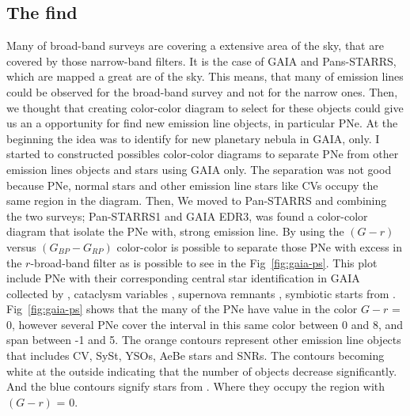 \documentclass[fleqn,usenatbib]{mnras}
\begin{document}
\subsection{The find}
\label{sec:find}

Many of broad-band surveys are covering a extensive area of the sky, that
are covered by those narrow-band filters. It is the case of GAIA and Pans-STARRS, which
are mapped a great are of the sky.
This means, that many of emission lines could be observed for the broad-band
survey and not for the narrow ones. Then, we thought that creating color-color
diagram to select for these objects
could give us an a opportunity for find new emission line objects, in particular PNe.
At the beginning the idea was to identify for new planetary nebula in GAIA, only.
I started to constructed possibles color-color diagrams to separate PNe from
other emission lines objects and stars using GAIA only. The separation was not
good because PNe, normal stars and other emission line stars like CVs occupy the
same region in the diagram. Then, We moved to Pan-STARRS and combining the two
surveys; Pan-STARRS1 and GAIA EDR3, was found a color-color diagram that isolate the PNe
with, strong \ha{} emission line. By using the \((G - r)\) versus \((G_{BP} - G_{RP})\)
color-color is possible to separate those PNe with excess in the $r$-broad-band
filter as is possible to see in the Fig~\ref{fig:gaia-ps}. This plot include PNe with their corresponding central star identification in GAIA collected by \citet{Gonzalez:2021}, 
cataclysm variables \citep{Downes:2006}, supernova remnants \citep{Green:2019}, symbiotic starts
from \citet{Akras:2019a}.  
Fig~\ref{fig:gaia-ps} shows that the many of the PNe have value in
the color \(G - r\) = 0, however several PNe cover the interval in this
same color between 0 and 8, and span between -1 and 5.
The orange contours represent other emission line objects that includes CV, SySt,
YSOs, AeBe stars and SNRs. The contours becoming white at the outside indicating
that the number of objects decrease significantly. And the blue contours signify
stars from \citet{Smart:2021}. Where they occupy the region with \((G - r)\) = 0.
\end{document}
